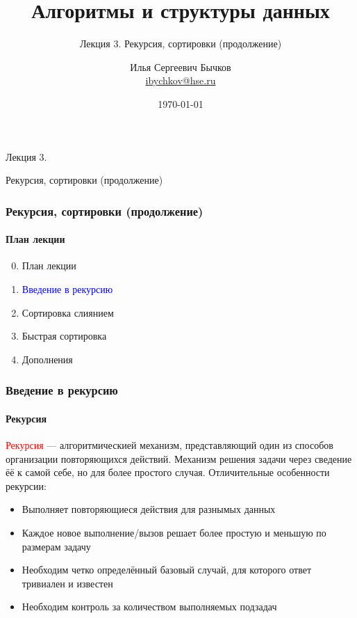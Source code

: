 \documentclass[aspectratio=169]{beamer}
\title[Title]{Алгоритмы и структуры данных}
\subtitle{Лекция 3. Рекурсия, сортировки (продолжение)}
\author[Author's name]{Илья Сергеевич Бычков\\ \smallskip \scriptsize \url{ibychkov@hse.ru}}
\institute{НИУ ВШЭ - Нижний Новгород}
\date{\today}
\begin{document}
\frame[plain]{\titlepage}

\begin{frame}[c]

\begin{center}
\Huge Лекция 3.

\Huge Рекурсия, сортировки (продолжение)
\end{center}

\end{frame}

\begin{frame}
\frametitle{Рекурсия, сортировки (продолжение)}
\framesubtitle{План лекции}

\begin{enumerate}
  \setcounter{enumi}{-1}
  \item{План лекции}
  \item{\textcolor{blue}{Введение в рекурсию}}
  \item{Сортировка слиянием}
  \item{Быстрая сортировка}
  \item{Дополнения}
\end{enumerate}
\end{frame}



\begin{frame}
\frametitle{Введение в рекурсию}
\framesubtitle{Рекурсия}
\justifying
\textcolor{red}{Рекурсия} — алгоритмическией механизм, представляющий один из способов \newline организации повторяющихся действий. Механизм решения задачи через сведение ёё к самой себе, но для более простого случая.\newline\newline
Отличительные особенности рекурсии:
\begin{itemize}
\item{Выполняет повторяющиеся действия для разнымых данных}
\item{Каждое новое выполнение/вызов решает более простую и меньшую по размерам задачу}
\item{Необходим четко определённый базовый случай, для которого ответ тривиален и известен}
\item{Необходим контроль за количеством выполняемых подзадач}
\end{itemize}
\end{frame}
\end{document}
